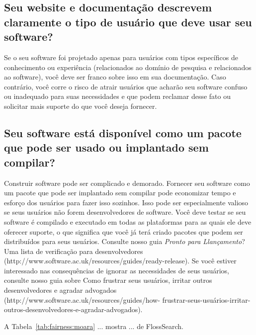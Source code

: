 \subsection*{Seu website e documentação descrevem claramente o tipo de usuário que deve usar seu software?}
Se o seu software foi projetado apenas para usuários com tipos específicos de conhecimento ou experiência (relacionados ao domínio de pesquisa e relacionados ao software), você deve ser franco sobre isso em sua documentação. Caso contrário, você corre o risco de atrair usuários que acharão seu software confuso ou inadequado para suas necessidades e que podem reclamar desse fato ou solicitar mais suporte do que você deseja fornecer.

\subsection*{Seu software está disponível como um pacote que pode ser usado ou implantado sem compilar?}
Construir software pode ser complicado e demorado. Fornecer seu software como um pacote que pode ser implantado sem compilar pode economizar tempo e esforço dos usuários para fazer isso sozinhos. Isso pode ser especialmente valioso se seus usuários não forem desenvolvedores de software.
Você deve testar se seu software é compilado e executado em todas as plataformas para as quais ele deve oferecer suporte, o que significa que você já terá criado pacotes que podem ser distribuídos para seus usuários.
Consulte nosso guia \textit{Pronto para Llançamento}? Uma lista de verificação para desenvolvedores (http://www.software.ac.uk/resources/guides/ready-release).
Se você estiver interessado nas consequências de ignorar as necessidades de seus usuários, consulte nosso guia sobre Como frustrar seus usuários, irritar outros desenvolvedores e agradar advogados (http://www.software.ac.uk/resources/guides/how- frustrar-seus-usuários-irritar-outros-desenvolvedores-e-agradar-advogados).

A Tabela~\ref{tab:fairness:moara} ... mostra ... de FlossSearch.




